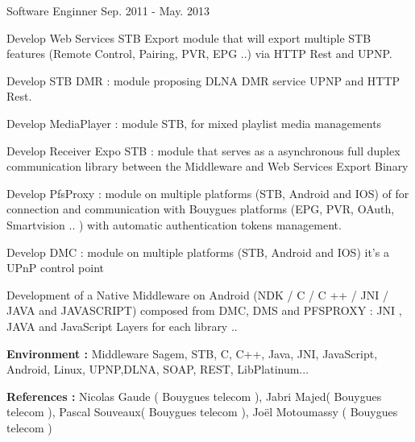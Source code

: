\begin{cventries}
\cventry
{Software Enginner} %
{}{}
{Sep. 2011 - May. 2013}
{ %
\begin{cvitems}
\item {Develop Web Services STB Export module that will export multiple STB features (Remote Control, Pairing, PVR, EPG ..) via HTTP Rest and UPNP. }
\item {Develop STB DMR : module proposing DLNA DMR service UPNP  and HTTP Rest. }
\item {Develop MediaPlayer : module STB, for mixed playlist media managements}
\item {Develop Receiver Expo STB : module that serves as a asynchronous full duplex communication library between the Middleware and Web Services Export Binary}
\item {Develop PfsProxy : module on multiple platforms (STB, Android and IOS) of for connection and communication with Bouygues platforms (EPG, PVR, OAuth, Smartvision .. ) with automatic authentication tokens management.}
\item {Develop DMC : module on multiple platforms (STB, Android and IOS)  it’s a UPnP control point }
\item {Development of a Native Middleware on Android (NDK / C / C ++ / JNI / JAVA and JAVASCRIPT) composed from  DMC, DMS and PFSPROXY :
JNI , JAVA and JavaScript Layers for each library ..}
\item { \textbf{Environment :}  Middleware Sagem, STB,   C, C++, Java, JNI, JavaScript, Android, Linux, UPNP,DLNA, SOAP, REST,  LibPlatinum...}
\item { \textbf{References :}  Nicolas Gaude ( Bouygues telecom ), Jabri Majed( Bouygues telecom ), Pascal Souveaux( Bouygues telecom ), Joël Motoumassy ( Bouygues telecom )}
\end{cvitems}
}



\end{cventries}
